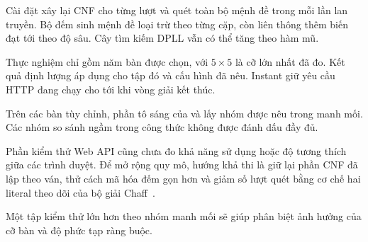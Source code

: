 \documentclass[11pt,a4paper]{article}
\newcommand{\code}[1]{\texttt{\detokenize{#1}}}
\begin{document}
Cài đặt xây lại CNF cho từng lượt và quét toàn bộ mệnh đề
trong mỗi lần lan truyền.
Bộ đếm sinh mệnh đề loại trừ theo từng cặp,
còn liên thông thêm biến đạt tới theo độ sâu.
Cây tìm kiếm DPLL vẫn có thể tăng theo hàm mũ.

Thực nghiệm chỉ gồm năm bàn được chọn,
với $5\times5$ là cỡ lớn nhất đã đo.
Kết quả định lượng áp dụng cho tập đó và cấu hình đã nêu.
Instant giữ yêu cầu HTTP đang chạy
cho tới khi vòng giải kết thúc.

Trên các bàn tùy chỉnh, phần tô sáng của
\code{GROUP_MOST} và \code{GROUP_ONLY}
lấy nhóm được nêu trong manh mối.
Các nhóm so sánh ngầm trong công thức
không được đánh dấu đầy đủ.

Phần kiểm thử Web API cũng chưa đo khả năng sử dụng
hoặc độ tương thích giữa các trình duyệt.
Để mở rộng quy mô, hướng khả thi là giữ lại phần CNF đã lập
theo ván, thử cách mã hóa đếm gọn hơn và giảm số lượt quét
bằng cơ chế hai literal theo dõi của bộ giải Chaff~\cite{chaff}.

Một tập kiểm thử lớn hơn theo nhóm manh mối sẽ giúp phân biệt
ảnh hưởng của cỡ bàn và độ phức tạp ràng buộc.

\clearpage

{}
\end{document}
